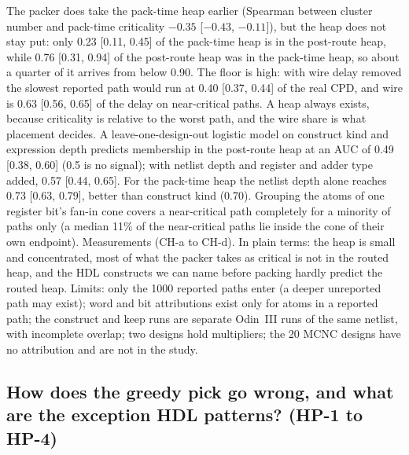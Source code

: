  The packer does take the pack-time heap earlier (Spearman between cluster number and pack-time criticality $-0.35$ [$-0.43$, $-0.11$]), but the heap does not stay put: only 0.23 [0.11, 0.45] of the pack-time heap is in the post-route heap, while 0.76 [0.31, 0.94] of the post-route heap was in the pack-time heap, so about a quarter of it arrives from below 0.90. The floor is high: with wire delay removed the slowest reported path would run at 0.40 [0.37, 0.44] of the real CPD, and wire is 0.63 [0.56, 0.65] of the delay on near-critical paths. A heap always exists, because criticality is relative to the worst path, and the wire share is what placement decides.
 A leave-one-design-out logistic model on construct kind and expression depth predicts membership in the post-route heap at an AUC of 0.49 [0.38, 0.60] (0.5 is no signal); with netlist depth and register and adder type added, 0.57 [0.44, 0.65]. For the pack-time heap the netlist depth alone reaches 0.73 [0.63, 0.79], better than construct kind (0.70). Grouping the atoms of one register bit's fan-in cone covers a near-critical path completely for a minority of paths only (a median 11\% of the near-critical paths lie inside the cone of their own endpoint).
 Measurements (CH-a to CH-d). In plain terms: the heap is small and concentrated, most of what the packer takes as critical is not in the routed heap, and the HDL constructs we can name before packing hardly predict the routed heap. Limits: only the 1000 reported paths enter (a deeper unreported path may exist); word and bit attributions exist only for atoms in a reported path; the construct and keep runs are separate Odin~III runs of the same netlist, with incomplete overlap; two designs hold multipliers; the 20 MCNC designs have no attribution and are not in the study.

\subsection{How does the greedy pick go wrong, and what are the exception HDL patterns? (HP-1 to HP-4)}
\label{sec:e-pick}

